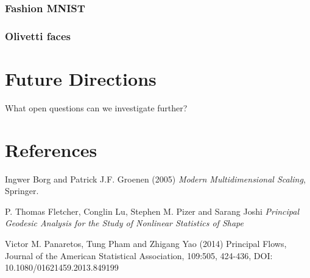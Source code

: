 \documentclass[12pt]{report}
\begin{document}
\subsection{Fashion MNIST}



\subsection{Olivetti faces}


\chapter*{Future Directions}

What open questions can we investigate further?


\chapter{References}
\begin{thebibliography}{9}

Ingwer Borg and Patrick J.F. Groenen (2005) \textit{Modern Multidimensional Scaling}, Springer.

P. Thomas Fletcher, Conglin Lu, Stephen M. Pizer and Sarang Joshi \textit{Principal Geodesic Analysis for the Study of
Nonlinear Statistics of Shape}


Victor M. Panaretos, Tung Pham and Zhigang Yao (2014) Principal Flows, Journal of the American Statistical
Association, 109:505, 424-436, DOI: 10.1080/01621459.2013.849199


\end{thebibliography}
\end{document}
